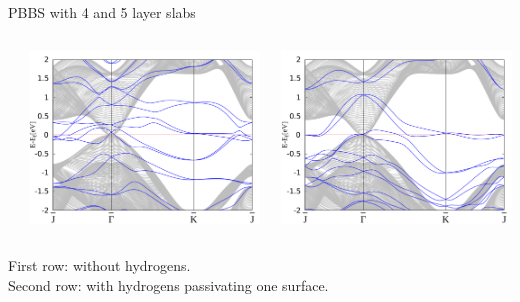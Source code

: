 \begin{frame}{PBBS with 4 and 5 layer slabs}
\begin{columns}
\begin{column}{.34\linewidth}
		\end{column}
		\begin{column}{.34\linewidth}
			\centering
			\includegraphics[width=\linewidth]{Te_termination/bulk+5_layers_no_dos_-2_2.pdf}
		\end{column}
		\begin{column}{.34\linewidth}
			\centering
			\includegraphics[width=\linewidth]{Hg_termination/bulk+5_layers_no_dos_-2_2.pdf}
		\end{column}
	\end{columns}
	\vspace{.3cm}
	\footnotesize{
	First row: without hydrogens. \\Second row: with hydrogens passivating one surface.}
\end{frame}

